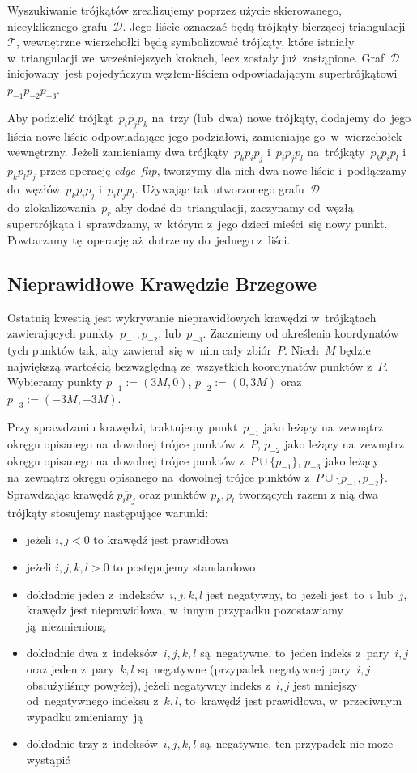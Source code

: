 \documentclass[skorowidz,autorrok,backref,xodstep,oswiadczenie]{wmimgr}
\begin{document}
Wyszukiwanie trójkątów zrealizujemy poprzez użycie skierowanego, niecyklicznego grafu~$\mathcal{D}$. Jego liście oznaczać będą trójkąty bierzącej triangulacji~$\mathcal{T}$, wewnętrzne wierzchołki będą symbolizować trójkąty, które istniały w~triangulacji we~wcześniejszych krokach, lecz zostały już~zastąpione. Graf~$\mathcal{D}$ inicjowany~jest pojedyńczym węzłem-liściem odpowiadającym supertrójkątowi~$p_{-1} p_{-2} p_{-3}$.

Aby podzielić trójkąt~$p_{i} p_{j} p_{k}$ na~trzy (lub~dwa) nowe trójkąty, dodajemy do~jego liścia nowe liście odpowiadające jego podziałowi, zamieniając go~w~wierzchołek wewnętrzny. Jeżeli zamieniamy dwa trójkąty~$p_{k} p_{i} p_{j}$ i~$p_{i} p_{j} p_{l}$ na~trójkąty~$p_{k} p_{i} p_{l}$ i~$p_{k} p_{l} p_{j}$ przez operację \emph{edge~flip}, tworzymy dla nich dwa nowe liście i~podłączamy do~węzłów~$p_{k} p_{i} p_{j}$ i~$p_{i} p_{j} p_{l}$. Używając tak utworzonego grafu~$\mathcal{D}$ do~zlokalizowania~$p_{r}$ aby dodać do~triangulacji, zaczynamy od~węzłą supertrójkąta i~sprawdzamy, w~którym z~jego dzieci mieści~się nowy punkt. Powtarzamy tę~operację aż~dotrzemy do~jednego z~liści.

\subsection{Nieprawidłowe Krawędzie Brzegowe}

Ostatnią kwestią jest wykrywanie nieprawidłowych krawędzi w~trójkątach zawierających punkty~$p_{-1}, p_{-2}$, lub~$p_{-3}$. Zaczniemy od określenia koordynatów tych punktów tak, aby zawierał~się w~nim cały zbiór~$P$. Niech~$M$ będzie największą wartością bezwzględną ze~wszystkich koordynatów punktów z~$P$. Wybieramy punkty $p_{-1} := (3M, 0)$, $p_{-2} := (0, 3M)$ oraz $p_{-3} := (-3M, -3M)$.

Przy sprawdzaniu krawędzi, traktujemy punkt~$p_{-1}$ jako leżący na~zewnątrz okręgu opisanego na~dowolnej trójce punktów z~$P$, $p_{-2}$ jako leżący na~zewnątrz okręgu opisanego na~dowolnej trójce punktów z~$P \cup \{p_{-1}\}$, $p_{-3}$ jako leżący na~zewnątrz okręgu opisanego na~dowolnej trójce punktów z~$P \cup \{p_{-1}, p_{-2}\}$. Sprawdzając krawędź $\overline{p_{i} p_{j}}$ oraz punktów $p_{k}, p_{l}$ tworzących razem z nią dwa trójkąty stosujemy następujące warunki:
\begin{itemize}
\item
jeżeli $i,j < 0$ to krawędź jest prawidłowa
\item
jeżeli $i, j, k, l > 0$ to postępujemy standardowo
\item
dokładnie jeden z~indeksów~$i, j, k, l$ jest negatywny, to~jeżeli jest~to~$i$ lub~$j$, krawędz jest nieprawidłowa, w~innym przypadku pozostawiamy ją~niezmienioną
\item
dokładnie dwa z~indeksów~$i, j, k, l$ są~negatywne, to~jeden indeks z~pary~$i, j$ oraz jeden z~pary~$k, l$ są~negatywne (przypadek negatywnej pary~$i, j$ obsłużyliśmy powyżej), jeżeli negatywny indeks z~$i, j$ jest mniejszy od~negatywnego indeksu z~$k, l$, to~krawędź jest prawidłowa, w~przeciwnym wypadku zmieniamy~ją
\item
dokładnie trzy z~indeksów~$i, j, k, l$ są~negatywne, ten przypadek nie może wystąpić
\end{itemize}
\end{document}
